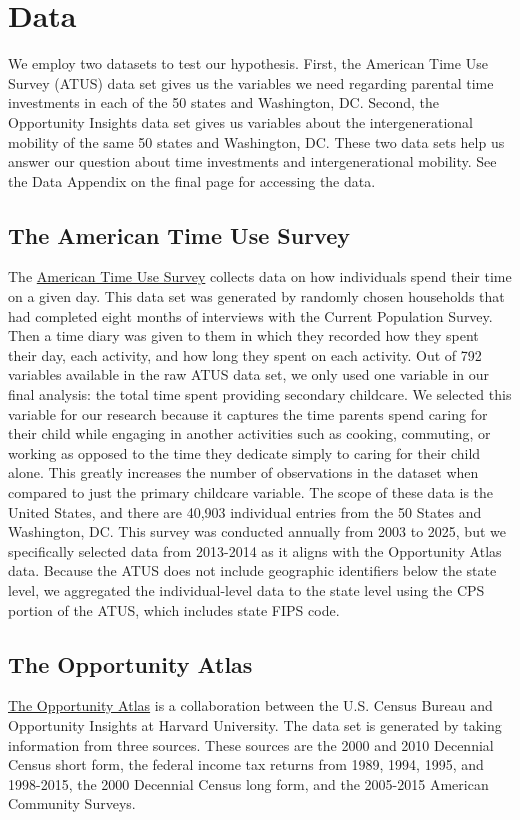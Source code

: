 \documentclass[12pt]{article}
\begin{document}
 

 

\section{Data}
\label{'sec:data'}

We employ two datasets to test our hypothesis. First, the American Time Use Survey (ATUS) data set gives us the variables we need regarding parental time investments in each of the 50 states and Washington, DC. Second, the Opportunity Insights data set gives us variables about the intergenerational mobility of the same 50 states and Washington, DC. These two data sets help us answer our question about time investments and intergenerational mobility. See the Data Appendix on the final page for accessing the data. 

\subsection{The American Time Use Survey}

The \href{https://www.bls.gov/tus/}{American Time Use Survey} collects data on how individuals spend their time on a given day. This data set was generated by randomly chosen households that had completed eight months of interviews with the Current Population Survey. Then a time diary was given to them in which they recorded how they spent their day, each activity, and how long they spent on each activity. Out of 792 variables available in the raw ATUS data set, we only used one variable in our final analysis: the total time spent providing secondary childcare. We selected this variable for our research because it captures the time parents spend caring for their child while engaging in another activities such as cooking, commuting, or working as opposed to the time they dedicate simply to caring for their child alone. This greatly increases the number of observations in the dataset when compared to just the primary childcare variable. The scope of these data is the United States, and there are 40,903 individual entries from the 50 States and Washington, DC. This survey was conducted annually from 2003 to 2025, but we specifically selected data from 2013-2014 as it aligns with the Opportunity Atlas data. Because the ATUS does not include geographic identifiers below the state level, we aggregated the individual-level data to the state level using the CPS portion of the ATUS, which includes state FIPS code. 

\subsection{The Opportunity Atlas}
\href{https://www.opportunityatlas.org/}{The Opportunity Atlas} is a collaboration between the U.S. Census Bureau and Opportunity Insights at Harvard University. The data set is generated by taking information from three sources. These sources are the 2000 and 2010 Decennial Census short form, the federal income tax returns from 1989, 1994, 1995, and 1998-2015, the 2000 Decennial Census long form, and the 2005-2015 American Community Surveys.
\end{document}

